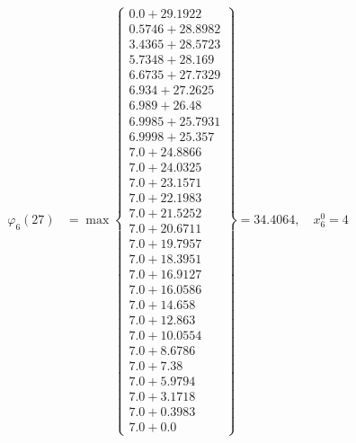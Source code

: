 \documentclass{article}
\begin{document}
\begin{align*}
\varphi_{6}(27) &= \max \left\{ \begin{array}{c}
0.0 + 29.1922 \\
 0.5746 + 28.8982 \\
 3.4365 + 28.5723 \\
 5.7348 + 28.169 \\
 6.6735 + 27.7329 \\
 6.934 + 27.2625 \\
 6.989 + 26.48 \\
 6.9985 + 25.7931 \\
 6.9998 + 25.357 \\
 7.0 + 24.8866 \\
 7.0 + 24.0325 \\
 7.0 + 23.1571 \\
 7.0 + 22.1983 \\
 7.0 + 21.5252 \\
 7.0 + 20.6711 \\
 7.0 + 19.7957 \\
 7.0 + 18.3951 \\
 7.0 + 16.9127 \\
 7.0 + 16.0586 \\
 7.0 + 14.658 \\
 7.0 + 12.863 \\
 7.0 + 10.0554 \\
 7.0 + 8.6786 \\
 7.0 + 7.38 \\
 7.0 + 5.9794 \\
 7.0 + 3.1718 \\
 7.0 + 0.3983 \\
 7.0 + 0.0
\end{array} \right\}=34.4064, \quad x_{6}^0=4\\
  

\end{align*}
\end{document}
